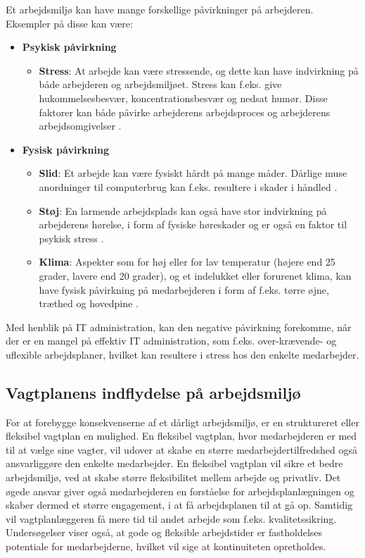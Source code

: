 Et arbejdsmiljø kan have mange forskellige påvirkninger på arbejderen. Eksempler på disse kan være: 
\begin{itemize}
    \item {\textbf{Psykisk påvirkning} \citep{Arbejdsmiljoe_psykisk}}
    \begin{itemize}
    \item {\textbf{Stress}: At arbejde kan være stressende, og dette kan have indvirkning på både arbejderen og arbejdsmiljøet. Stress kan f.eks. give hukommelsesbesvær, koncentrationsbesvær og nedsat humør. Disse faktorer kan både påvirke arbejderens arbejdsproces og arbejderens arbejdsomgivelser \citep{Arbejdsmiljoe_stress}.}
    \end{itemize}
    \item {\textbf{Fysisk påvirkning} \citep{Arbejdsmiljoe_fysisk}}
    \begin{itemize}
    \item {\textbf{Slid}: Et arbejde kan være fysiskt hårdt på mange måder. Dårlige muse anordninger til computerbrug kan f.eks. resultere i skader i håndled \citep{Arbejdsmiljoe_fysisk}.}
    \item {\textbf{Støj}: En larmende arbejdsplads kan også have stor indvirkning på arbejderens hørelse, i form af fysiske høreskader og er også en faktor til psykisk stress \citep{Arbejdsmiljoe_stoej}.}
    \item {\textbf{Klima}: Aspekter som for høj eller for lav temperatur (højere end 25 grader, lavere end 20 grader), og et indelukket eller forurenet klima, kan have fysisk påvirkning på medarbejderen i form af f.eks. tørre øjne, træthed og hovedpine \citep{Arbejdsmiljoe_indeklima}.}\\
    \end{itemize}
\end{itemize}

Med henblik på IT administration, kan den negative påvirkning forekomme, når der er en mangel på effektiv IT administration, som f.eks. over-krævende- og uflexible arbejdsplaner, hvilket kan resultere i stress hos den enkelte medarbejder\citep{Cambridge2011}.

\subsection{Vagtplanens indflydelse på arbejdsmiljø}
For at forebygge konsekvenserne af et dårligt arbejdsmiljø, er en struktureret eller fleksibel vagtplan en mulighed. En fleksibel vagtplan, hvor medarbejderen er med til at vælge sine vagter, vil udover at skabe en større medarbejdertilfredshed også ansvarliggøre den enkelte medarbejder. En fleksibel vagtplan vil sikre et bedre arbejdsmiljø, ved at skabe større fleksibilitet mellem arbejde og privatliv. Det øgede ansvar giver også medarbejderen en forståelse for arbejdsplanlægningen og skaber dermed et større engagement, i at få arbejdsplanen til at gå op. Samtidig vil vagtplanlæggeren få mere tid til andet arbejde som f.eks. kvalitetssikring.
Undersøgelser viser også, at gode og fleksible arbejdstider er fastholdelses potentiale for medarbejderne, hvilket vil sige at kontinuiteten opretholdes. \\

